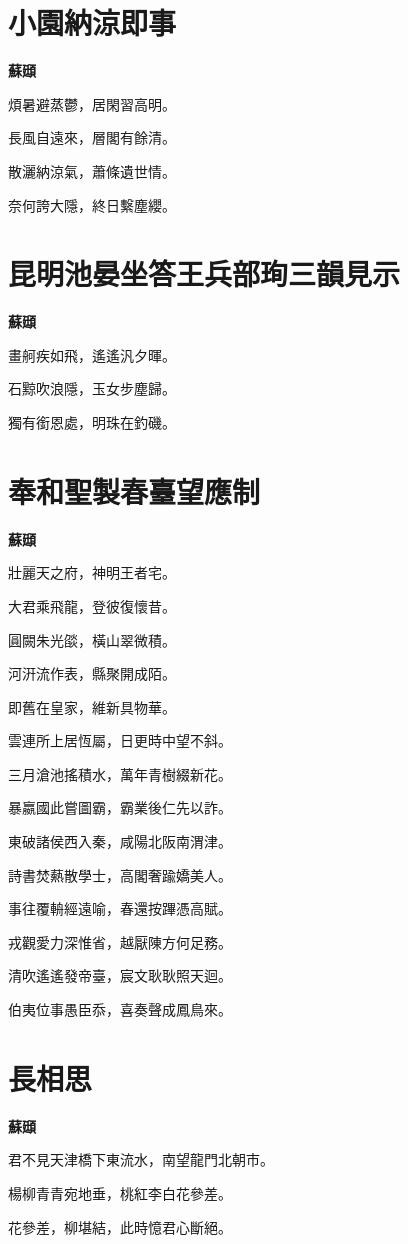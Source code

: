 \documentclass[12pt,a4paper]{ctexbook}
\begin{document}
\section{小園納涼即事}
\textbf{蘇頲}\par\vspace{0.5em}
煩暑避蒸鬱，居閑習高明。\par
長風自遠來，層閣有餘清。\par
散灑納涼氣，蕭條遺世情。\par
奈何誇大隱，終日繫塵纓。\par

\section{昆明池晏坐答王兵部珣三韻見示}
\textbf{蘇頲}\par\vspace{0.5em}
畫舸疾如飛，遙遙汎夕暉。\par
石黥吹浪隱，玉女步塵歸。\par
獨有銜恩處，明珠在釣磯。\par

\section{奉和聖製春臺望應制}
\textbf{蘇頲}\par\vspace{0.5em}
壯麗天之府，神明王者宅。\par
大君乘飛龍，登彼復懷昔。\par
圓闕朱光燄，橫山翠微積。\par
河汧流作表，縣聚開成陌。\par
即舊在皇家，維新具物華。\par
雲連所上居恆屬，日更時中望不斜。\par
三月滄池搖積水，萬年青樹綴新花。\par
暴嬴國此嘗圖霸，霸業後仁先以詐。\par
東破諸侯西入秦，咸陽北阪南渭津。\par
詩書焚爇散學士，高閣奢踰嬌美人。\par
事往覆輈經遠喻，春還按蹕憑高賦。\par
戎觀愛力深惟省，越厭陳方何足務。\par
清吹遙遙發帝臺，宸文耿耿照天迴。\par
伯夷位事愚臣忝，喜奏聲成鳳鳥來。\par

\section{長相思}
\textbf{蘇頲}\par\vspace{0.5em}
君不見天津橋下東流水，南望龍門北朝市。\par
楊柳青青宛地垂，桃紅李白花參差。\par
花參差，柳堪結，此時憶君心斷絕。\par
\end{document}

